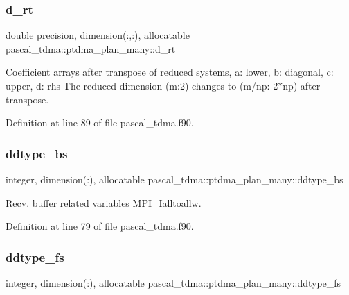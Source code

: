\subsubsection{\texorpdfstring{d\_rt}{d\_rt}}
{\footnotesize\ttfamily double precision, dimension(\+:,\+:), allocatable pascal\+\_\+tdma\+::ptdma\+\_\+plan\+\_\+many\+::d\+\_\+rt}



Coefficient arrays after transpose of reduced systems, a\+: lower, b\+: diagonal, c\+: upper, d\+: rhs The reduced dimension (m\+:2) changes to (m/np\+: 2$\ast$np) after transpose. 



Definition at line 89 of file pascal\+\_\+tdma.\+f90.

\mbox{\label{structpascal__tdma_1_1ptdma__plan__many_a54ddb10078b443daf47204cdcd8e7f8f}} 
\subsubsection{\texorpdfstring{ddtype\_bs}{ddtype\_bs}}
{\footnotesize\ttfamily integer, dimension(\+:), allocatable pascal\+\_\+tdma\+::ptdma\+\_\+plan\+\_\+many\+::ddtype\+\_\+bs}



Recv. buffer related variables M\+P\+I\+\_\+\+Ialltoallw. 



Definition at line 79 of file pascal\+\_\+tdma.\+f90.

\mbox{\label{structpascal__tdma_1_1ptdma__plan__many_ad95f6ed58387dd66baecf53ed5fab7e8}} 
\subsubsection{\texorpdfstring{ddtype\_fs}{ddtype\_fs}}
{\footnotesize\ttfamily integer, dimension(\+:), allocatable pascal\+\_\+tdma\+::ptdma\+\_\+plan\+\_\+many\+::ddtype\+\_\+fs}



